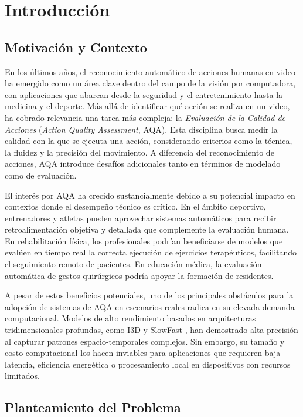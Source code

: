 \chapter{Introducción}

\section{Motivación y Contexto}

En los últimos años, el reconocimiento automático de acciones humanas en video ha emergido como un área clave dentro del campo de la visión por computadora, con aplicaciones que abarcan desde la seguridad y el entretenimiento hasta la medicina y el deporte. Más allá de identificar qué acción se realiza en un video, ha cobrado relevancia una tarea más compleja: la \emph{Evaluación de la Calidad de Acciones} (\textit{Action Quality Assessment}, \ac{AQA}). Esta disciplina busca medir la calidad con la que se ejecuta una acción, considerando criterios como la técnica, la fluidez y la precisión del movimiento. A diferencia del reconocimiento de acciones, \ac{AQA} introduce desafíos adicionales tanto en términos de modelado como de evaluación.

El interés por \ac{AQA} ha crecido sustancialmente debido a su potencial impacto en contextos donde el desempeño técnico es crítico. En el ámbito deportivo, entrenadores y atletas pueden aprovechar sistemas automáticos para recibir retroalimentación objetiva y detallada que complemente la evaluación humana. En rehabilitación física, los profesionales podrían beneficiarse de modelos que evalúen en tiempo real la correcta ejecución de ejercicios terapéuticos, facilitando el seguimiento remoto de pacientes. En educación médica, la evaluación automática de gestos quirúrgicos podría apoyar la formación de residentes.

A pesar de estos beneficios potenciales, uno de los principales obstáculos para la adopción de sistemas de \ac{AQA} en escenarios reales radica en su elevada demanda computacional. Modelos de alto rendimiento basados en arquitecturas tridimensionales profundas, como \ac{I3D} \cite{Carreira2017I3D} y SlowFast \cite{feichtenhofer2019slowfast}, han demostrado alta precisión al capturar patrones espacio-temporales complejos. Sin embargo, su tamaño y costo computacional los hacen inviables para aplicaciones que requieren baja latencia, eficiencia energética o procesamiento local en dispositivos con recursos limitados.

\section{Planteamiento del Problema}

